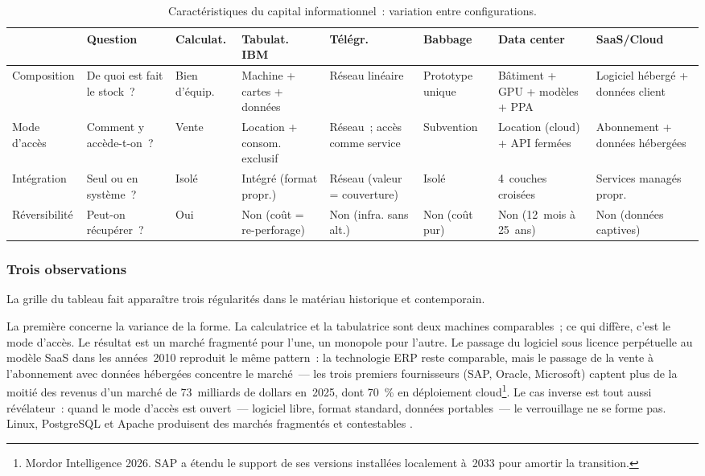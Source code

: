 \begin{table}[!ht]
\caption{Caractéristiques du capital informationnel~: variation entre configurations.}\label{tab:d2-capital}
\centering\footnotesize
\renewcommand{\arraystretch}{1.35}
\begin{tabularx}{\textwidth}{@{}p{1.6cm}p{2.8cm}p{1.6cm}p{1.6cm}p{1.6cm}p{1.6cm}p{1.6cm}p{1.6cm}@{}}
\toprule
 & \textbf{Question} & \textbf{Calculat.} & \textbf{Tabulat. IBM} & \textbf{Télégr.} & \textbf{Babbage} & \textbf{Data center} & \textbf{SaaS/Cloud} \\
\midrule
Composition & De quoi est fait le stock~? & Bien d'équip. & Machine + cartes + données & Réseau linéaire & Prototype unique & Bâtiment + GPU + modèles + PPA & Logiciel hébergé + données client \\
Mode d'accès & Comment y accède-t-on~? & Vente & Location + consom. exclusif & Réseau~; accès comme service & Subvention & Location (cloud) + API fermées & Abonnement + données hébergées \\
Intégration & Seul ou en système~? & Isolé & Intégré (format propr.) & Réseau (valeur = couverture) & Isolé & 4~couches croisées & Services managés propr. \\
Réversibilité & Peut-on récupérer~? & Oui & Non (coût = re-perforage) & Non (infra. sans alt.) & Non (coût pur) & Non (12~mois à 25~ans) & Non (données captives) \\
\bottomrule
\end{tabularx}
\renewcommand{\arraystretch}{1.0}
\end{table}


\subsubsection{Trois observations}

La grille du tableau fait apparaître trois régularités dans le matériau historique et contemporain.

La première concerne la variance de la forme. La calculatrice et la tabulatrice sont deux machines comparables~; ce qui diffère, c'est le mode d'accès. Le résultat est un marché fragmenté pour l'une, un monopole pour l'autre. Le passage du logiciel sous licence perpétuelle au modèle SaaS dans les années~2010 reproduit le même pattern~: la technologie ERP reste comparable, mais le passage de la vente à l'abonnement avec données hébergées concentre le marché~--- les trois premiers fournisseurs (SAP, Oracle, Microsoft) captent plus de la moitié des revenus d'un marché de 73~milliards de dollars en~2025, dont 70~\% en déploiement cloud\footnote{Mordor Intelligence 2026. SAP a étendu le support de ses versions installées localement à~2033 pour amortir la transition.}. Le cas inverse est tout aussi révélateur~: quand le mode d'accès est ouvert~--- logiciel libre, format standard, données portables~--- le verrouillage ne se forme pas. Linux, PostgreSQL et Apache produisent des marchés fragmentés et contestables \parencite{benkler_wealth_2006,hess_understanding_2007}.

